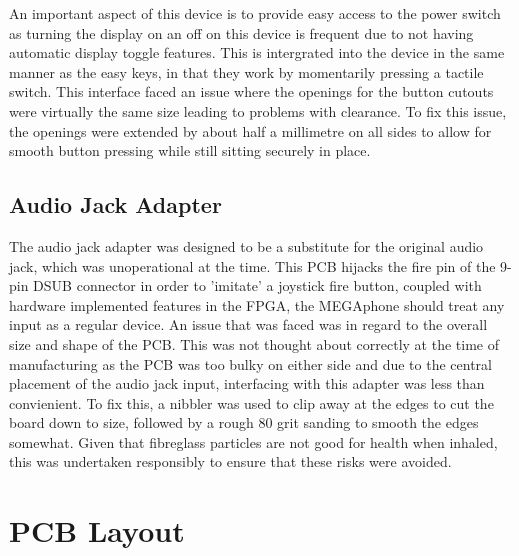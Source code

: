 An important aspect of this device is to provide easy access to the power switch as turning the display on an off on this device is frequent due to not having automatic display toggle features.
This is intergrated into the device in the same manner as the easy keys, in that they work by momentarily pressing a tactile switch.
This interface faced an issue where the openings for the button cutouts were virtually the same size leading to problems with clearance. 
To fix this issue, the openings were extended by about half a millimetre on all sides to allow for smooth button pressing while still sitting securely in place.

\subsection{Audio Jack Adapter}

The audio jack adapter was designed to be a substitute for the original audio jack, which was unoperational at the time.
This PCB hijacks the fire pin of the 9-pin DSUB connector in order to 'imitate' a joystick fire button, coupled with hardware implemented features in the FPGA, the MEGAphone should treat any input as a regular device.
An issue that was faced was in regard to the overall size and shape of the PCB.
This was not thought about correctly at the time of manufacturing as the PCB was too bulky on either side and due to the central placement of the audio jack input, interfacing with this adapter was less than convienient.
To fix this, a nibbler was used to clip away at the edges to cut the board down to size, followed by a rough 80 grit sanding to smooth the edges somewhat.
Given that fibreglass particles are not good for health when inhaled, this was undertaken responsibly to ensure that these risks were avoided.


\section{PCB Layout}


